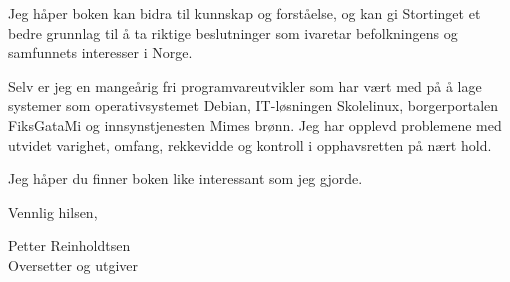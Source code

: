\documentclass[a4paper, 11pt, norsk]{article}
\begin{document}
Jeg håper boken kan bidra til kunnskap og forståelse, og kan gi
Stortinget et bedre grunnlag til å ta riktige beslutninger som
ivaretar befolkningens og samfunnets interesser i Norge.

Selv er jeg en mangeårig fri programvareutvikler som har vært med på å
lage systemer som operativsystemet Debian, IT-løsningen Skolelinux,
borgerportalen FiksGataMi og innsynstjenesten Mimes brønn.  Jeg har
opplevd problemene med utvidet varighet, omfang, rekkevidde og
kontroll i opphavsretten på nært hold.

Jeg håper du finner boken like interessant som jeg gjorde.

\vspace{3\parskip}

Vennlig hilsen,

Petter Reinholdtsen \\
Oversetter og utgiver
\end{document}
